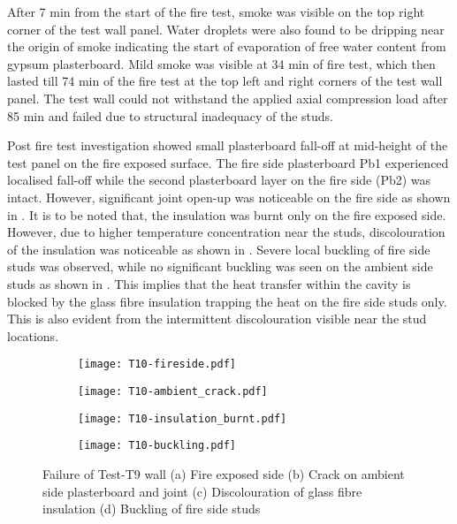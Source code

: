 After 7 min from the start of the fire test, smoke was visible on the top right corner of the test wall panel. Water droplets were also found to be dripping near the origin of smoke indicating the start of evaporation of free water content from gypsum plasterboard. Mild smoke was visible at 34 min of fire test, which then lasted till 74 min of the fire test at the top left and right corners of the test wall panel. The test wall could not withstand the applied axial compression load after 85 min and failed due to structural inadequacy of the studs. 

Post fire test investigation showed small plasterboard fall-off at mid-height of the test panel on the fire exposed surface. The fire side plasterboard Pb1 experienced localised fall-off while the second plasterboard layer on the fire side (Pb2) was intact. However, significant joint open-up was noticeable on the fire side as shown in . It is to be noted that, the insulation was burnt only on the fire exposed side. However, due to higher temperature concentration near the studs, discolouration of the insulation was noticeable as shown in . Severe local buckling of fire side studs was observed, while no significant buckling was seen on the ambient side studs as shown in . This implies that the heat transfer within the cavity is blocked by the glass fibre insulation trapping the heat on the fire side studs only. This is also evident from the intermittent discolouration visible near the stud locations. 
\begin{figure}[!htbp]
	\centering
	\begin{subfigure}[b]{0.4\textwidth}
		\centering
		\texttt{[image: T10-fireside.pdf]}
		\caption{}
		\label{subfig:T10-fireside}
	\end{subfigure}
	\begin{subfigure}[b]{0.4\textwidth}
		\centering
		\texttt{[image: T10-ambient\_crack.pdf]}
		\caption{}
		\label{subfig:T10-ambient_crack}
	\end{subfigure}
	   \label{fig:T10-failure-a}
\end{figure}
\begin{figure}[!htbp]
	\ContinuedFloat
	\centering
	\begin{subfigure}[b]{0.8\textwidth}
		\centering
		\texttt{[image: T10-insulation\_burnt.pdf]}
		\caption{}
		\label{subfig:T10-insulation_burnt}
	\end{subfigure}
	\begin{subfigure}[b]{0.8\textwidth}
		\centering
		\texttt{[image: T10-buckling.pdf]}
		\caption{}
		\label{subfig:T10-buckling}
	\end{subfigure}
	   \caption{Failure of Test-T9 wall (a) Fire exposed side (b) Crack on ambient side plasterboard and joint (c) Discolouration of glass fibre insulation (d) Buckling of fire side studs}
	   \label{fig:T10-failure-b}
\end{figure}

